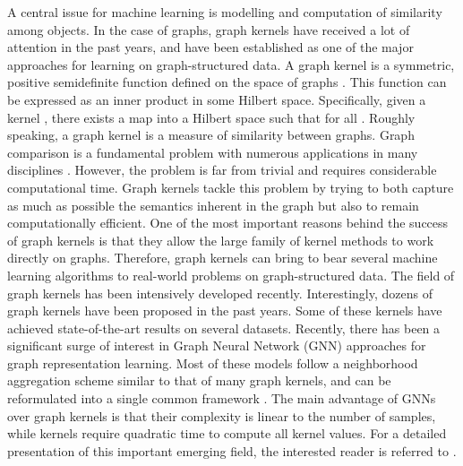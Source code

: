 \documentclass[twoside,11pt]{article}
\begin{document}
A central issue for machine learning is modelling and computation of similarity among objects.
In the case of graphs, graph kernels have received a lot of attention in the past years, and have been established as one of the major approaches for learning on graph-structured data.
A graph kernel is a symmetric, positive semidefinite function defined on the space of graphs .
This function can be expressed as an inner product in some Hilbert space.
Specifically, given a kernel , there exists a map  into a Hilbert space  such that  for all .
Roughly speaking, a graph kernel is a measure of similarity between graphs.
Graph comparison is a fundamental problem with numerous applications in many disciplines .
However, the problem is far from trivial and requires considerable computational time.
Graph kernels tackle this problem by trying to both capture as much as possible the semantics inherent in the graph but also to remain computationally efficient.
One of the most important reasons behind the success of graph kernels is that they allow the large family of kernel methods to work directly on graphs.
Therefore, graph kernels can bring to bear several machine learning algorithms to real-world problems on graph-structured data.
The field of graph kernels has been intensively developed recently.
Interestingly, dozens of graph kernels have been proposed in the past  years.
Some of these kernels have achieved state-of-the-art results on several datasets.
Recently, there has been a significant surge of interest in Graph Neural Network (GNN) approaches for graph representation learning.
Most of these models follow a neighborhood aggregation scheme similar to that of many graph kernels, and can be reformulated into a single common framework .
The main advantage of GNNs over graph kernels is that their complexity is linear to the number of samples, while kernels require quadratic time to compute all kernel values.
For a detailed presentation of this important emerging field, the interested reader is referred to .
\end{document}
